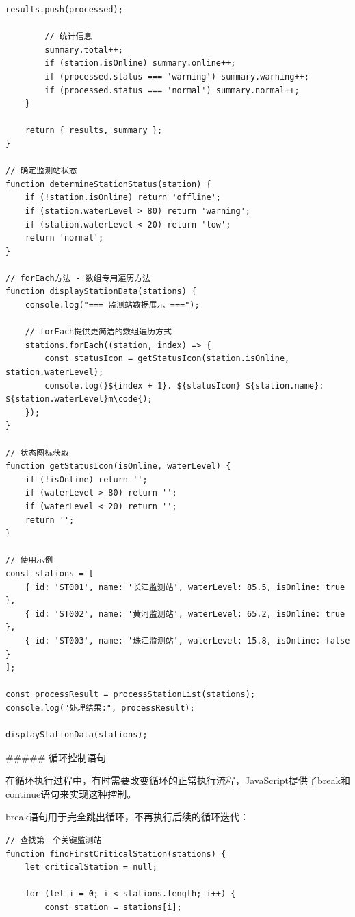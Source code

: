 {\begin{lstlisting}[style=javascript]
        results.push(processed);
        
        // 统计信息
        summary.total++;
        if (station.isOnline) summary.online++;
        if (processed.status === 'warning') summary.warning++;
        if (processed.status === 'normal') summary.normal++;
    }
    
    return { results, summary };
}

// 确定监测站状态
function determineStationStatus(station) {
    if (!station.isOnline) return 'offline';
    if (station.waterLevel > 80) return 'warning';
    if (station.waterLevel < 20) return 'low';
    return 'normal';
}

// forEach方法 - 数组专用遍历方法
function displayStationData(stations) {
    console.log("=== 监测站数据展示 ===");
    
    // forEach提供更简洁的数组遍历方式
    stations.forEach((station, index) => {
        const statusIcon = getStatusIcon(station.isOnline, station.waterLevel);
        console.log(}${index + 1}. ${statusIcon} ${station.name}: ${station.waterLevel}m\code{);
    });
}

// 状态图标获取
function getStatusIcon(isOnline, waterLevel) {
    if (!isOnline) return '';
    if (waterLevel > 80) return '';
    if (waterLevel < 20) return '';
    return '';
}

// 使用示例
const stations = [
    { id: 'ST001', name: '长江监测站', waterLevel: 85.5, isOnline: true },
    { id: 'ST002', name: '黄河监测站', waterLevel: 65.2, isOnline: true },
    { id: 'ST003', name: '珠江监测站', waterLevel: 15.8, isOnline: false }
];

const processResult = processStationList(stations);
console.log("处理结果:", processResult);

displayStationData(stations);
\end{lstlisting}

##### 循环控制语句

在循环执行过程中，有时需要改变循环的正常执行流程，JavaScript提供了break和continue语句来实现这种控制。


break语句用于完全跳出循环，不再执行后续的循环迭代：

\begin{lstlisting}[style=javascript]
// 查找第一个关键监测站
function findFirstCriticalStation(stations) {
    let criticalStation = null;
    
    for (let i = 0; i < stations.length; i++) {
        const station = stations[i];
        

\end{lstlisting}}
